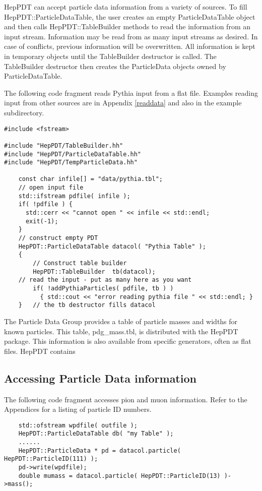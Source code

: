 HepPDT can accept particle data information from a variety of sources.
To fill HepPDT::ParticleDataTable, 
the user creates an empty ParticleDataTable object
and then calls HepPDT::TableBuilder methods to read the information 
from an input stream.
Information may be read from as many input streams as desired.
In case of conflicts, previous information will be overwritten.
All information is kept in temporary objects until the TableBuilder destructor
is called.  
The TableBuilder destructor then creates the ParticleData objects owned
by ParticleDataTable.  

The following code fragment reads Pythia input from a flat file.
Examples reading input from other sources are in Appendix \ref{readdata} 
and also in the example subdirectory. 

\begin{verbatim}
#include <fstream>

#include "HepPDT/TableBuilder.hh"
#include "HepPDT/ParticleDataTable.hh"
#include "HepPDT/TempParticleData.hh"

    const char infile[] = "data/pythia.tbl";
    // open input file
    std::ifstream pdfile( infile );
    if( !pdfile ) { 
      std::cerr << "cannot open " << infile << std::endl;
      exit(-1);
    }
    // construct empty PDT
    HepPDT::ParticleDataTable datacol( "Pythia Table" );
    {
        // Construct table builder
        HepPDT::TableBuilder  tb(datacol);
	// read the input - put as many here as you want
        if( !addPythiaParticles( pdfile, tb ) ) 
	      { std::cout << "error reading pythia file " << std::endl; }
    }	// the tb destructor fills datacol
\end{verbatim}

The Particle Data Group provides a table of particle masses and widths for known
particles.  This table,  pdg\_mass.tbl, is distributed with the HepPDT package.
This information is also available from specific generators, often as
flat files.  HepPDT contains 

\subsection { Accessing Particle Data information }

The following code fragment accesses pion and muon information.
Refer to the Appendices for a listing of particle ID numbers.
\begin{verbatim}
    std::ofstream wpdfile( outfile );
    HepPDT::ParticleDataTable db( "my Table" );
    ......
    HepPDT::ParticleData * pd = datacol.particle( HepPDT::ParticleID(111) );
    pd->write(wpdfile);
    double mumass = datacol.particle( HepPDT::ParticleID(13) )->mass();
\end{verbatim}

